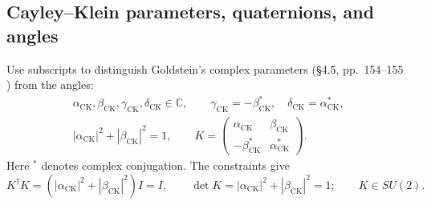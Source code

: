 \subsection{Cayley--Klein parameters, quaternions, and angles}
\label{gnc:sec:cayley-klein}
Use subscripts to distinguish Goldstein's complex parameters
(\S4.5, pp.~154--155 \cite{dgdt:GPS2001}) from the angles:
\begin{equation}\label{gnc:ck-constraints}
 \begin{gathered}
 \alpha_{\mathrm{CK}},\beta_{\mathrm{CK}},\gamma_{\mathrm{CK}},
 \delta_{\mathrm{CK}}\in\mathbb C,\qquad
 \gamma_{\mathrm{CK}}=-\beta_{\mathrm{CK}}^*,\quad
 \delta_{\mathrm{CK}}=\alpha_{\mathrm{CK}}^*,\\
 |\alpha_{\mathrm{CK}}|^2+|\beta_{\mathrm{CK}}|^2=1,\qquad
 K=\begin{pmatrix}\alpha_{\mathrm{CK}}&\beta_{\mathrm{CK}}\\
                  -\beta_{\mathrm{CK}}^*&\alpha_{\mathrm{CK}}^*\end{pmatrix}.
 \end{gathered}
\end{equation}
Here $^*$ denotes complex conjugation. The constraints give
\[
 K^\dagger K=(|\alpha_{\mathrm{CK}}|^2+|\beta_{\mathrm{CK}}|^2)I=I,
 \qquad \det K=|\alpha_{\mathrm{CK}}|^2+|\beta_{\mathrm{CK}}|^2=1;
 \qquad K\in SU(2).
\]

